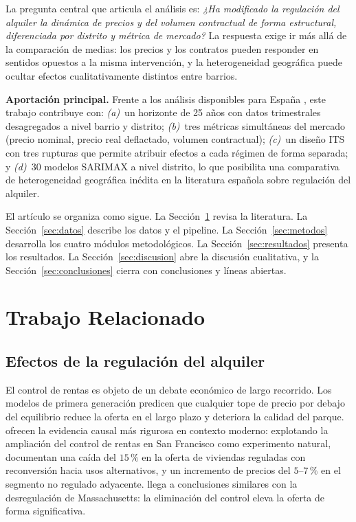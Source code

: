 \documentclass[10pt,a4paper,twocolumn]{article}
\begin{document}
La pregunta central que articula el análisis es: \textit{¿Ha modificado la regulación
del alquiler la dinámica de precios y del volumen contractual de forma estructural,
diferenciada por distrito y métrica de mercado?} La respuesta exige ir más allá de
la comparación de medias: los precios y los contratos pueden responder en sentidos
opuestos a la misma intervención, y la heterogeneidad geográfica puede ocultar efectos
cualitativamente distintos entre barrios.

\textbf{Aportación principal.} Frente a los análisis disponibles para España
\citep{garcia2018housing,bosch2021ley11}, este trabajo contribuye con: \textit{(a)}~un
horizonte de 25 años con datos trimestrales desagregados a nivel barrio y distrito;
\textit{(b)}~tres métricas simultáneas del mercado (precio nominal, precio real
deflactado, volumen contractual); \textit{(c)}~un diseño ITS con tres rupturas que
permite atribuir efectos a cada régimen de forma separada; y \textit{(d)}~30 modelos
SARIMAX a nivel distrito, lo que posibilita una comparativa de heterogeneidad
geográfica inédita en la literatura española sobre regulación del alquiler.

El artículo se organiza como sigue. La Sección~\ref{sec:relacionados} revisa la
literatura. La Sección~\ref{sec:datos} describe los datos y el pipeline. La
Sección~\ref{sec:metodos} desarrolla los cuatro módulos metodológicos. La
Sección~\ref{sec:resultados} presenta los resultados. La
Sección~\ref{sec:discusion} abre la discusión cualitativa, y la
Sección~\ref{sec:conclusiones} cierra con conclusiones y líneas abiertas.

\section{Trabajo Relacionado}
\label{sec:relacionados}

\subsection{Efectos de la regulación del alquiler}

El control de rentas es objeto de un debate económico de largo recorrido. Los modelos
de primera generación \citep{arnott1995rent} predicen que cualquier tope de precio
por debajo del equilibrio reduce la oferta en el largo plazo y deteriora la calidad
del parque. \citet{diamond2019rent} ofrecen la evidencia causal más rigurosa en
contexto moderno: explotando la ampliación del control de rentas en San Francisco como
experimento natural, documentan una caída del $15\,\%$ en la oferta de viviendas
reguladas con reconversión hacia usos alternativos, y un incremento de precios del
$5$--$7\,\%$ en el segmento no regulado adyacente. \citet{sims2007rent} llega a
conclusiones similares con la desregulación de Massachusetts: la eliminación del
control eleva la oferta de forma significativa.
\end{document}
